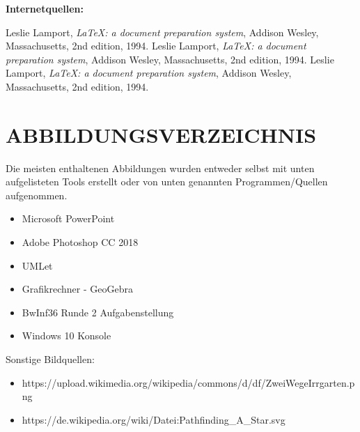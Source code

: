 \documentclass[a4paper,12pt]{article}
\begin{document}
\vspace{1cm}

\begin{large}
\textbf{Internetquellen:}
\end{large}

\begin{thebibliography}{9}

      Leslie Lamport,
      \textit{\LaTeX: a document preparation system},
      Addison Wesley, Massachusetts,
      2nd edition,
      1994.
      Leslie Lamport,
      \textit{\LaTeX: a document preparation system},
      Addison Wesley, Massachusetts,
      2nd edition,
      1994.
      Leslie Lamport,
      \textit{\LaTeX: a document preparation system},
      Addison Wesley, Massachusetts,
      2nd edition,
      1994.

\end{thebibliography}

\endgroup


\newpage
\section{ABBILDUNGSVERZEICHNIS}
Die meisten enthaltenen Abbildungen wurden entweder selbst mit unten aufgelisteten Tools erstellt oder von unten genannten Programmen/Quellen aufgenommen.
\begin{itemize}
\item Microsoft PowerPoint
\item Adobe Photoshop CC 2018
\item UMLet
\item Grafikrechner - GeoGebra
\item BwInf36 Runde 2 Aufgabenstellung
\item Windows 10 Konsole
\end{itemize}

Sonstige Bildquellen:
\begin{itemize}
\item https://upload.wikimedia.org/wikipedia/commons/d/df/ZweiWegeIrrgarten.png
\item https://de.wikipedia.org/wiki/Datei:Pathfinding\_A\_Star.svg
\end{itemize}
\end{document}
